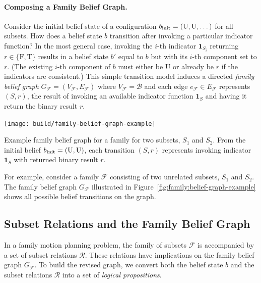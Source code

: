 \paragraph{Composing a Family Belief Graph.}
Consider the initial belief state of a configuration
$b_{\mbox{\scriptsize init}} = \left( \mbox{U}, \mbox{U}, \dots \right)$
for all subsets.
How does a belief state $b$ transition after invoking a particular
indicator function?
In the most general case,
invoking the $i$-th indicator $\mathbf{1}_{S_i}$ returning
$r \in \{\mbox{F},\mbox{T}\}$
results in a belief state $b'$ equal to $b$ but with its
$i$-th component set to $r$.
(The existing $i$-th component of $b$ must either be U
or already be $r$ if the indicators are consistent.)
This simple transition model induces a directed
\emph{family belief graph}
$G_{\mathcal{F}} = (V_{\mathcal{F}}, E_{\mathcal{F}})$
where $V_{\mathcal{F}} = \mathcal{B}$
and each edge $e_{\mathcal{F}} \in E_{\mathcal{F}}$ represents $(S,r)$,
the result of invoking an available indicator function $\mathbf{1}_{S}$
and having it return the binary result $r$.

\begin{marginfigure}
   \centering
   \texttt{[image: build/family-belief-graph-example]}
   \caption{Example family belief graph
      for a family for two subsets, $S_1$ and $S_2$.
      From the initial belief $b_{\mbox{\scriptsize init}} = (\mbox{U},\mbox{U})$,
      each transition $(S,r)$ represents invoking
      indicator $\mathbf{1}_S$ with returned binary result $r$.
      }
   \label{fig:family:belief-graph-example}
\end{marginfigure}

For example,
consider a family $\mathcal{F}$ consisting of two unrelated subsets,
$S_1$ and $S_2$.
The family belief graph $G_{\mathcal{F}}$
illustrated in Figure~\ref{fig:family:belief-graph-example}
shows all possible belief transitions on the graph.

\subsection{Subset Relations and the Family Belief Graph}
In a family motion planning problem,
the family of subsets $\mathcal{F}$
is accompanied by a set of subset relations $\mathcal{R}$.
These relations have implications on the family belief graph
$G_{\mathcal{F}}$.
To build the revised graph,
we convert both the belief state $b$
and the subset relations $\mathcal{R}$
into a set of \emph{logical propositions}.

